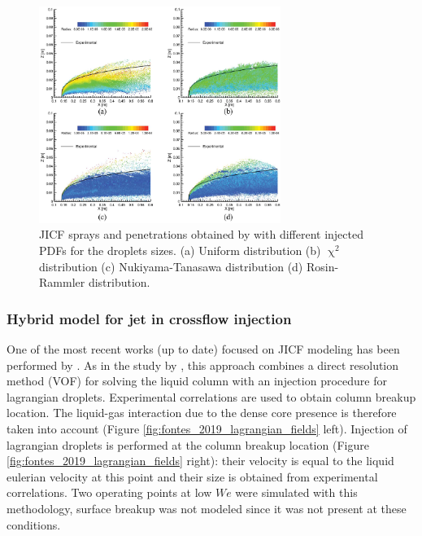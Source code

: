 \begin{figure}[ht]
    \centering
    \includegraphics[width=0.7\textwidth]{./part1_numerical_approaches/figures_ch3/fan_2018_jets_penetration}
       \centering
    \caption{JICF sprays and penetrations obtained by  with different injected PDFs for the droplets sizes. (a) Uniform distribution (b) $\upchi^2$ distribution (c) Nukiyama-Tanasawa distribution (d) Rosin-Rammler distribution.}
    \label{fig:fan_2018_jets_penetration}
\end{figure}



\subsubsection*{Hybrid model for jet in crossflow injection }

One of the most recent works (up to date) focused on JICF modeling has been performed by . As in the study by , this approach combines a direct resolution method (VOF) for solving the liquid column with an injection procedure for lagrangian droplets. Experimental correlations are used to obtain column breakup location. The liquid-gas interaction due to the dense core presence is therefore taken into account (Figure \ref{fig:fontes_2019_lagrangian_fields} left). Injection of lagrangian droplets is performed at the column breakup location (Figure \ref{fig:fontes_2019_lagrangian_fields} right): their velocity is equal to the liquid eulerian velocity at this point and their size is obtained from experimental correlations. Two operating points at low $We$ were simulated with this methodology, surface breakup was not modeled since it was not present at these conditions. 

